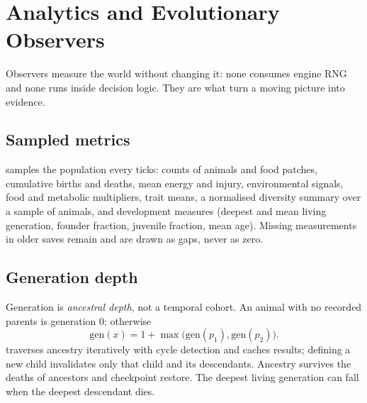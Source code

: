 \chapter{Analytics and Evolutionary Observers}

Observers measure the world without changing it: none consumes engine RNG and
none runs inside decision logic. They are what turn a moving picture into
evidence.

\section{Sampled metrics}
 samples the population every 
ticks: counts of animals and food patches, cumulative births and deaths, mean
energy and injury, environmental signals, food and metabolic multipliers, trait
means, a normalised diversity summary over a sample of 
animals, and development measures (deepest and mean living generation, founder
fraction, juvenile fraction, mean age). Missing measurements in older saves remain
 and are drawn as gaps, never as zero.

\section{Generation depth}
Generation is \emph{ancestral depth}, not a temporal cohort. An animal with no
recorded parents is generation 0; otherwise
\[
\text{gen}(x)=1+\max\big(\text{gen}(p_1),\text{gen}(p_2)\big).
\]
 traverses ancestry iteratively with cycle
detection and caches results; defining a new child invalidates only that child and
its descendants. Ancestry survives the deaths of ancestors and checkpoint restore.
The deepest living generation can fall when the deepest descendant dies.

